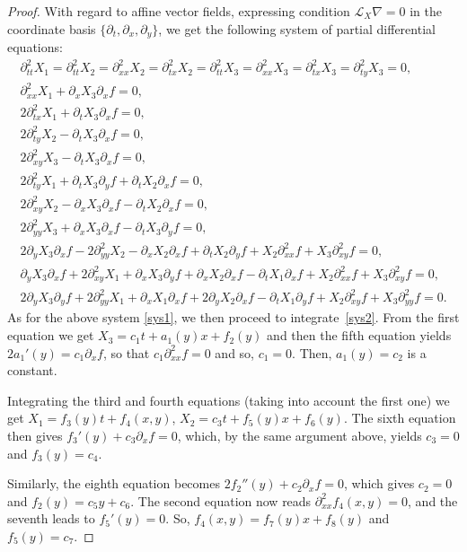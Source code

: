 \documentclass[10pt,a4paper]{amsart}
\numberwithin{equation}{section}
\begin{document}
\begin{proof}
With regard to af\/f\/ine vector f\/ields, expressing condition $\mathcal L_X\nabla=0$ in the coordinate basis $\{\partial_t,\partial_x,\partial_y\}$, we get the following system of partial dif\/ferential equations:
\begin{gather}
\partial_{tt}^2X_1=\partial_{tt}^2X_2=\partial_{xx}^2X_2=\partial_{tx}^2X_2=\partial_{tt}^2X_3=\partial_{xx}^2X_3=\partial_{tx}^2X_3=\partial_{ty}^2X_3=0,
\nonumber\\
\partial_{xx}^2X_1+\partial_xX_3\partial_xf=0,\nonumber\\
2\partial_{tx}^2X_1+\partial_tX_3\partial_xf=0,\nonumber\\
2\partial_{ty}^2X_2-\partial_tX_3\partial_xf=0,\nonumber\\
2\partial_{xy}^2X_3-\partial_tX_3\partial_xf=0,\nonumber\\
2\partial_{ty}^2X_1+\partial_tX_3\partial_yf+\partial_tX_2\partial_xf=0,\nonumber\\
2\partial_{xy}^2X_2-\partial_xX_3\partial_xf-\partial_tX_2\partial_xf=0,\nonumber\\
2\partial_{yy}^2X_3+\partial_xX_3\partial_xf-\partial_tX_3\partial_yf=0,\nonumber\\
2\partial_yX_3\partial_xf-2\partial_{yy}^2X_2-\partial_xX_2\partial_xf+\partial_tX_2\partial_yf+X_2\partial_{xx}^2f+X_3\partial_{xy}^2f=0,\nonumber\\
 \partial_yX_3\partial_xf+2\partial_{xy}^2X_1+\partial_xX_3\partial_yf+\partial_xX_2\partial_xf-\partial_tX_1\partial_xf
 +X_2\partial_{xx}^2f+X_3\partial_{xy}^2f=0,\nonumber\\
 2\partial_yX_3\partial_yf+2\partial_{yy}^2X_1+\partial_xX_1\partial_xf+2\partial_yX_2\partial_xf-\partial_tX_1\partial_yf
 +X_2\partial_{xy}^2f+X_3\partial_{yy}^2f=0.\label{sys2}
\end{gather}
As for the above system \eqref{sys1}, we then proceed to integrate~\eqref{sys2}. From the f\/irst equation we get $X_3=c_1t+a_1(y)x+f_2(y)$ and then the f\/ifth equation yields $2a_1 '(y)=c_1\partial_xf$, so that $c_1\partial_{xx}^2f=0$ and so, $c_1=0$. Then, $a_1(y)=c_2$ is a constant.

Integrating the third and fourth equations (taking into account the f\/irst one) we get $X_1=f_3(y)t+f_4(x,y)$, $X_2=c_3t+f_5(y)x+f_6(y)$. The sixth equation then gives $f_3 '(y)+c_3\partial_xf=0$, which, by the same argument above, yields $c_3=0$ and $f_3(y)=c_4$.

Similarly, the eighth equation becomes $2f_2 ''(y)+c_2\partial_xf=0$, which gives $c_2=0$ and $f_2(y)=c_5y+c_6$. The second equation now reads $\partial_{xx}^2f_4(x,y)=0$, and the seventh leads to $f_5 '(y)=0$. So, $f_4(x,y)=f_7(y)x+f_8(y)$ and $f_5(y)=c_7$.


\end{proof}
\end{document}
